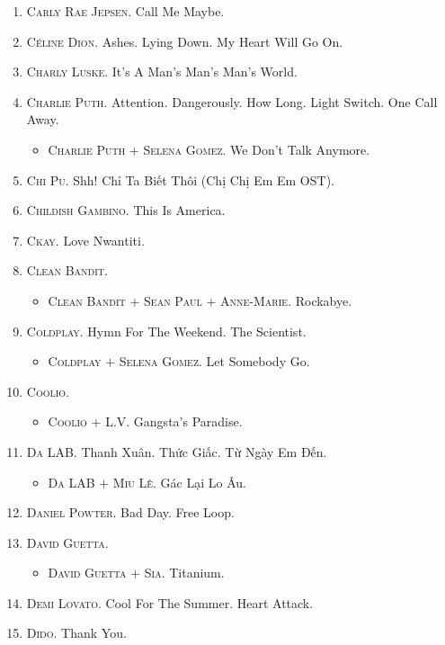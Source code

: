 \documentclass[oneside]{book}
\numberwithin{equation}{section}
\begin{document}
\begin{enumerate}
	\item \textsc{Carly Rae Jepsen.} Call Me Maybe.
	\item \textsc{C\'eline Dion.} Ashes. Lying Down. My Heart Will Go On.
	\item \textsc{Charly Luske.} It's A Man's Man's Man's World.
	\item \textsc{Charlie Puth.} Attention. Dangerously. How Long. Light Switch. One Call Away.
	\begin{itemize}
		\item \textsc{Charlie Puth $+$ Selena Gomez.} We Don't Talk Anymore.
	\end{itemize}
	\item \textsc{Chi Pu.} Shh! Chỉ Ta Biết Thôi (Chị Chị Em Em OST).
	\item \textsc{Childish Gambino.} This Is America.
	\item \textsc{Ckay.} Love Nwantiti.
	\item \textsc{Clean Bandit.}
	\begin{itemize}
		\item \textsc{Clean Bandit $+$ Sean Paul $+$ Anne-Marie.} Rockabye.
	\end{itemize}
	\item \textsc{Coldplay.} Hymn For The Weekend. The Scientist.
	\begin{itemize}
		\item \textsc{Coldplay $+$ Selena Gomez.} Let Somebody Go.
	\end{itemize}
	\item \textsc{Coolio.}
	\begin{itemize}
		\item \textsc{Coolio $+$ L.V.} Gangsta's Paradise.
	\end{itemize}
	\item \textsc{Da LAB.} Thanh Xuân. Thức Giấc. Từ Ngày Em Đến.
	\begin{itemize}
		\item \textsc{Da LAB $+$ Miu Lê.} Gác Lại Lo Âu.
	\end{itemize}
	\item \textsc{Daniel Powter.} Bad Day. Free Loop.
	\item \textsc{David Guetta.}
	\begin{itemize}
		\item \textsc{David Guetta $+$ Sia.} Titanium.
	\end{itemize}
	\item \textsc{Demi Lovato.} Cool For The Summer. Heart Attack.
	\item \textsc{Dido.} Thank You.

\end{enumerate}
\end{document}
